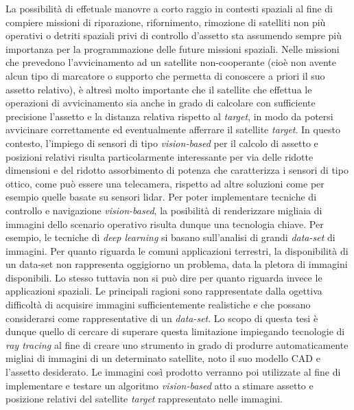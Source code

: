 La possibilità di effetuale manovre a corto raggio in contesti spaziali al fine di compiere missioni di riparazione, rifornimento, rimozione di satelliti non più operativi o detriti spaziali privi di controllo d'assetto sta assumendo sempre più importanza per la programmazione delle future missioni spaziali. Nelle missioni che prevedono l'avvicinamento ad un satellite non-cooperante (cioè non avente alcun tipo di marcatore o supporto che permetta di conoscere a priori il suo assetto relativo), è altresì molto importante che il satellite che effettua le operazioni di avvicinamento sia anche in grado di calcolare con sufficiente precisione l'assetto e la distanza relativa rispetto al \textit{target}, in modo da potersi avvicinare correttamente ed eventualmente afferrare il satellite \textit{target}. In questo contesto, l'impiego di sensori di tipo \textit{vision-based} per il calcolo di assetto e posizioni relativi risulta particolarmente interessante per via delle ridotte dimensioni e del ridotto assorbimento di potenza che caratterizza i sensori di tipo ottico, come può essere una telecamera, rispetto ad altre soluzioni come per esempio quelle basate su sensori \acrshort{lidar}. Per poter implementare tecniche di controllo e navigazione \textit{vision-based}, la posibilità di renderizzare migliaia di immagini dello scenario operativo risulta dunque una tecnologia chiave. Per esempio, le tecniche di \textit{deep learning} si basano sull'analisi di grandi \textit{data-set} di immagini.
Per quanto riguarda le comuni applicazioni terrestri, la disponibilità di un data-set non rappresenta oggigiorno un problema, data la pletora di immagini disponibili. Lo stesso tuttavia non si può dire per quanto riguarda invece le applicazioni spaziali. Le principali ragioni sono rappresentate dalla ogettiva difficoltà di acquisire immagini sufficientemente realistiche e che possano considerarsi come rappresentative di un \textit{data-set}.
Lo scopo di questa tesi è dunque quello di cercare di superare questa limitazione impiegando tecnologie di \textit{ray tracing} al fine di creare uno strumento in grado di produrre automaticamente migliai di immagini di un determinato satellite, noto il suo modello CAD e l'assetto desiderato. Le immagini così prodotto verranno poi utilizzate al fine di implementare e testare un algoritmo \textit{vision-based} atto a stimare assetto e posizione relativi del satellite \textit{target} rappresentato nelle immagini.
